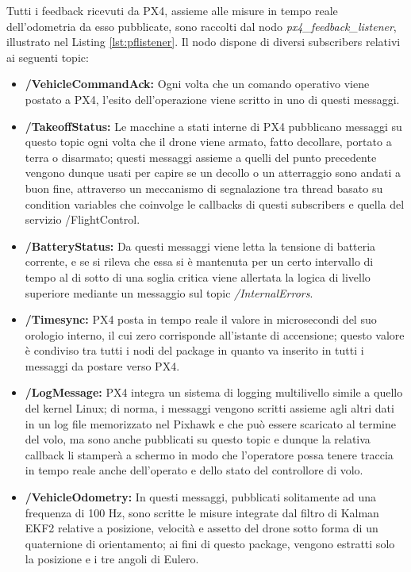 Tutti i feedback ricevuti da PX4, assieme alle misure in tempo reale dell'odometria da esso pubblicate, sono raccolti dal nodo \emph{px4\_feedback\_listener}, illustrato nel Listing \ref{lst:pflistener}. Il nodo dispone di diversi subscribers relativi ai seguenti topic:
\begin{itemize}
    \item \textbf{/VehicleCommandAck:} Ogni volta che un comando operativo viene postato a PX4, l'esito dell'operazione viene scritto in uno di questi messaggi.
    \item \textbf{/TakeoffStatus:} Le macchine a stati interne di PX4 pubblicano messaggi su questo topic ogni volta che il drone viene armato, fatto decollare, portato a terra o disarmato; questi messaggi assieme a quelli del punto precedente vengono dunque usati per capire se un decollo o un atterraggio sono andati a buon fine, attraverso un meccanismo di segnalazione tra thread basato su condition variables che coinvolge le callbacks di questi subscribers e quella del servizio /FlightControl.
    \item \textbf{/BatteryStatus:} Da questi messaggi viene letta la tensione di batteria corrente, e se si rileva che essa si è mantenuta per un certo intervallo di tempo al di sotto di una soglia critica viene allertata la logica di livello superiore mediante un messaggio sul topic \emph{/InternalErrors}.
    \item \textbf{/Timesync:} PX4 posta in tempo reale il valore in microsecondi del suo orologio interno, il cui zero corrisponde all'istante di accensione; questo valore è condiviso tra tutti i nodi del package in quanto va inserito in tutti i messaggi da postare verso PX4.
    \item \textbf{/LogMessage:} PX4 integra un sistema di logging multilivello simile a quello del kernel Linux; di norma, i messaggi vengono scritti assieme agli altri dati in un log file memorizzato nel Pixhawk e che può essere scaricato al termine del volo, ma sono anche pubblicati su questo topic e dunque la relativa callback li stamperà a schermo in modo che l'operatore possa tenere traccia in tempo reale anche dell'operato e dello stato del controllore di volo.
    \item \textbf{/VehicleOdometry:} In questi messaggi, pubblicati solitamente ad una frequenza di 100 Hz, sono scritte le misure integrate dal filtro di Kalman EKF2 relative a posizione, velocità e assetto del drone sotto forma di un quaternione di orientamento; ai fini di questo package, vengono estratti solo la posizione e i tre angoli di Eulero.
\end{itemize}
